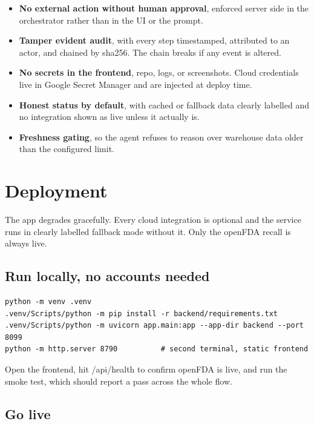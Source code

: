\documentclass[11pt]{article}
\newcommand{\code}[1]{{\ttfamily\small #1}}
\begin{document}
\begin{itemize}
\item \textbf{No external action without human approval}, enforced server side in the orchestrator rather than in the UI or the prompt.
\item \textbf{Tamper evident audit}, with every step timestamped, attributed to an actor, and chained by sha256. The chain breaks if any event is altered.
\item \textbf{No secrets in the frontend}, repo, logs, or screenshots. Cloud credentials live in Google Secret Manager and are injected at deploy time.
\item \textbf{Honest status by default}, with cached or fallback data clearly labelled and no integration shown as live unless it actually is.
\item \textbf{Freshness gating}, so the agent refuses to reason over warehouse data older than the configured limit.
\end{itemize}

\section{Deployment}

The app degrades gracefully. Every cloud integration is optional and the service runs in clearly
labelled fallback mode without it. Only the openFDA recall is always live.

\subsection{Run locally, no accounts needed}

\begin{lstlisting}[style=sh,caption={From the repo root.}]
python -m venv .venv
.venv/Scripts/python -m pip install -r backend/requirements.txt
.venv/Scripts/python -m uvicorn app.main:app --app-dir backend --port 8099
python -m http.server 8790          # second terminal, static frontend
\end{lstlisting}

Open the frontend, hit \code{/api/health} to confirm openFDA is live, and run the smoke test, which
should report a pass across the whole flow.

\subsection{Go live}
\end{document}
